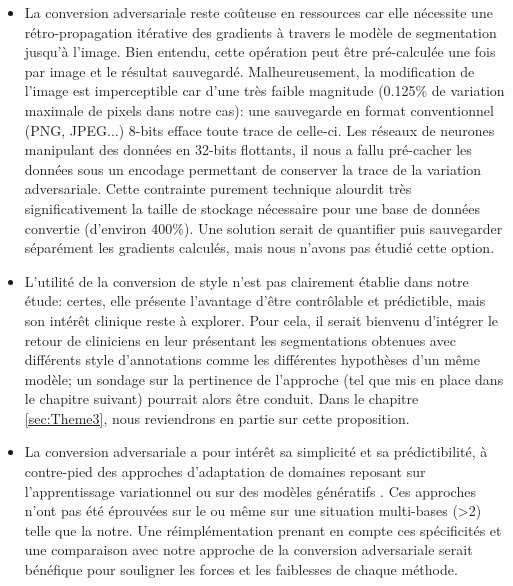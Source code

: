 \begin{itemize}
	\item La conversion adversariale reste coûteuse en ressources car elle nécessite une rétro-propagation itérative des gradients à travers le modèle de segmentation jusqu'à l'image. Bien entendu, cette opération peut être pré-calculée une fois par image et le résultat sauvegardé. Malheureusement, la modification de l'image est imperceptible car d'une très faible magnitude (0.125\% de variation maximale de pixels dans notre cas): une sauvegarde en format conventionnel (PNG, JPEG...) 8-bits efface toute trace de celle-ci. Les réseaux de neurones manipulant des données en 32-bits flottants, il nous a fallu pré-cacher les données sous un encodage permettant de conserver la trace de la variation adversariale. Cette contrainte purement technique alourdit très significativement la taille de stockage nécessaire pour une base de données convertie (d'environ 400\%). Une solution serait de  quantifier puis sauvegarder séparément les gradients calculés, mais nous n'avons pas étudié cette option. 
	\item L'utilité de la conversion de style n'est pas clairement établie dans notre étude: certes, elle présente l'avantage d'être contrôlable et prédictible, mais son intérêt clinique reste à explorer. Pour cela, il serait bienvenu d'intégrer le retour de cliniciens en leur présentant les segmentations obtenues avec différents style d'annotations comme les différentes hypothèses d'un même modèle; un sondage sur la pertinence de l'approche (tel que mis en place dans le chapitre suivant) pourrait alors être conduit. Dans le chapitre \ref{sec:Theme3}, nous reviendrons en partie sur cette proposition. 
	\item La conversion adversariale a pour intérêt sa simplicité et sa prédictibilité, à contre-pied des approches d'adaptation de domaines reposant sur l'apprentissage variationnel \cite{kohl2018probabilistic} ou sur des modèles génératifs \cite{choiSelfEnsemblingGANBasedData2019}. Ces approches n'ont pas été éprouvées sur le \fundus{} ou même sur une situation multi-bases (>2) telle que la notre. Une réimplémentation prenant en compte ces spécificités et une comparaison avec notre approche de la conversion adversariale serait bénéfique pour souligner les forces et les faiblesses de chaque méthode.
\end{itemize}

